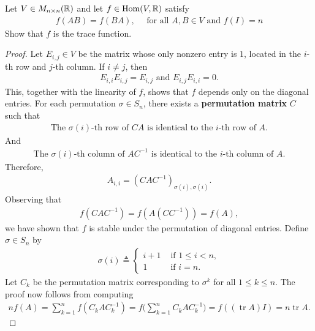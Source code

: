 \documentclass{report}
\begin{document}
\begin{question}{}{}
Let $V \in M_{n\times n}(\mathbb{R})$ and let $f\in \operatorname{Hom}(V,\mathbb{R})$ satisfy 
\begin{align*}
f(AB)=f(BA),\quad\text{ for all }A,B \in V \text{ and }f(I)=n
\end{align*}
Show that $f$ is the trace function. 
\end{question}
\begin{proof}
Let $E_{i,j}\in V$ be the matrix whose only nonzero entry is $1$, located in the $i$-th row and $j$-th column. If $i \neq j$, then  
\begin{align*}
E_{i,i}E_{i,j}=E_{i,j}\text{ and }E_{i,j}E_{i,i}=0.
\end{align*}
This, together with the linearity of $f$, shows that $f$ depends only on the diagonal entries. For each permutation $\sigma \in S_n$, there exists a \textbf{permutation matrix} $C$ such that  
\begin{align*}
\text{The $\sigma(i)$-th row of }CA\text{ is identical to the $i$-th row of }A.
\end{align*}
And  
\begin{align*}
\text{The $\sigma(i)$-th column of }AC^{-1}\text{ is identical to the $i$-th column of }A.
\end{align*}
Therefore,  
\begin{align*}
  A_{i,i}=(CAC^{-1})_{\sigma (i),\sigma (i)}.
\end{align*}
Observing that  
\begin{align*}
f(CAC^{-1})=f(A(CC^{-1}))=f(A),
\end{align*}
we have shown that $f$ is stable under the permutation of diagonal entries. Define $\sigma \in S_n$ by  
\begin{align*}
\sigma(i)\triangleq \begin{cases}
  i+1& \text{ if } 1\leq i<n, \\
  1& \text{ if } i=n.
\end{cases}
\end{align*}
Let $C_k$ be the permutation matrix corresponding to $\sigma^k$ for all $1\leq k\leq n$. The proof now follows from computing  
\begin{align*}
nf(A)= \sum_{k=1}^{n}f(C_kAC_k^{-1})=f\Big(\sum_{k=1}^n C_kAC_k^{-1}\Big)= f((\operatorname{tr}A)I)=n\operatorname{tr}A.
\end{align*}
\end{proof}
\end{document}
